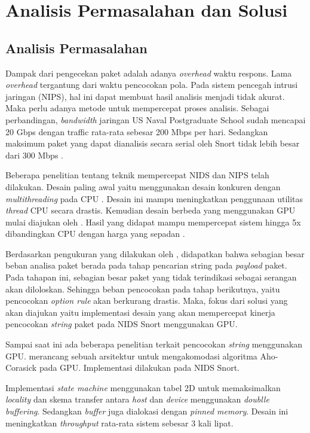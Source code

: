 
\chapter{Analisis Permasalahan dan Solusi}

  \section{Analisis Permasalahan}

    Dampak dari pengecekan paket adalah adanya \emph{overhead} waktu respons. Lama \emph{overhead} tergantung dari waktu pencocokan pola. Pada sistem pencegah intrusi jaringan (NIPS), hal ini dapat membuat hasil analisis menjadi tidak akurat. Maka perlu adanya metode untuk mempercepat proses analisis. Sebagai perbandingan, \emph{bandwidth} jaringan US Naval Postgraduate School sudah mencapai 20 Gbps dengan traffic rata-rata sebesar 200 Mbps per hari. Sedangkan maksimum paket yang dapat dianalisis secara serial oleh Snort tidak lebih besar dari 300 Mbps \citep{albin2012}.

    Beberapa penelitian tentang teknik mempercepat NIDS dan NIPS telah dilakukan. Desain paling awal yaitu menggunakan desain konkuren dengan \emph{multithreading} pada CPU \citep{multi2004}. Desain ini mampu meningkatkan penggunaan utilitas \emph{thread} CPU secara drastis. Kemudian desain berbeda yang menggunakan GPU mulai diajukan oleh \cite{gnort2008}. Hasil yang didapat mampu mempercepat sistem hingga 5x dibandingkan CPU dengan harga yang sepadan \citep{smith2009}.

    Berdasarkan pengukuran yang dilakukan oleh \cite{kargus2012}, didapatkan bahwa sebagian besar beban analisa paket berada pada tahap pencarian string pada \emph{payload} paket. Pada tahapan ini, sebagian besar paket yang tidak terindikasi sebagai serangan akan diloloskan. Sehingga beban pencocokan pada tahap berikutnya, yaitu pencocokan \emph{option rule} akan berkurang drastis. Maka, fokus dari solusi yang akan diajukan yaitu implementasi desain yang akan mempercepat kinerja pencocokan \emph{string} paket pada NIDS Snort menggunakan GPU. 

    Sampai saat ini ada beberapa penelitian terkait pencocokan \emph{string} menggunakan GPU. \cite{gnort2008} merancang sebuah arsitektur untuk mengakomodasi algoritma Aho-Corasick pada GPU. Implementasi dilakukan pada NIDS Snort. 
    
    Implementasi \emph{state machine} menggunakan tabel 2D untuk memaksimalkan \emph{locality} dan skema transfer antara \emph{host} dan \emph{device} menggunakan \emph{doublle buffering}. Sedangkan \emph{buffer} juga dialokasi dengan \emph{pinned memory}. Desain ini meningkatkan \emph{throughput} rata-rata sistem sebesar 3 kali lipat.

